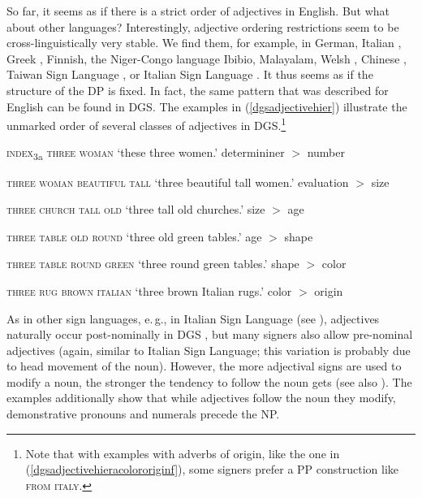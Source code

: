 So far, it seems as if there is a strict order of adjectives in English. But what about other languages? Interestingly, adjective ordering restrictions seem to be cross-linguistically very stable. We find them, for example, in German, Italian \citep{cinque2010syntax}, Greek \citep{alexiadou2001adjective}, Finnish, the Niger-Congo language Ibibio, Malayalam, Welsh \citep{scott2002stacked}, Chinese \citep{sproat1991cross}, Taiwan Sign Language \citep{zhang2007universal}, or Italian Sign Language \citep{bertone2009syntax, mantovan2017nominalmoditalian}. It thus seems as if the structure of the DP is fixed. In fact, the same pattern that was described for English can be found in DGS. The examples in (\ref{dgsadjectivehier}) illustrate the unmarked order of several classes of adjectives in DGS.\footnote{ Note that with examples with adverbs of origin, like the one in (\ref{dgsadjectivehieracolororiginf}), some signers prefer a PP construction like \textsc{from italy}.}

\begin{exe}
\ex\label{dgsadjectivehier}\begin{xlist} 
\ex \textsc{index}\textsubscript{3a} \textsc{three woman} 
\glt `these three women.' \hfill determininer $>$ number \label{dgsadjectivehiera}

\ex \textsc{three woman beautiful tall} 
\glt `three beautiful tall women.' \hfill evaluation $>$ size \label{dgsadjectivehierb}

\ex \textsc{three church tall old} 
\glt `three tall old churches.' \hfill size $>$ age \label{dgsadjectivehierc}

\ex \textsc{three table old round}%
\glt `three old green tables.' \hfill age $>$ shape \label{dgsadjectivehierd}

\ex  \textsc{three table round green}%
\glt `three round green tables.' \hfill shape $>$ color \label{dgsadjectivehiere}

\ex \textsc{three rug brown italian} 
\glt `three brown Italian rugs.' \hfill color $>$ origin \label{dgsadjectivehieracolororiginf}
\end{xlist}
\end{exe}

\noindent As in other sign languages, e.\,g., in Italian Sign Language (see \citealt[284]{cecchetto2009another}), adjectives naturally occur post-nominally in DGS \citep[18]{herrmann2013modal}, but many signers also allow pre-nominal adjectives (again, similar to Italian Sign Language; this variation is probably due to head movement of the noun). However, the more adjectival signs are used to modify a noun, the stronger the tendency to follow the noun gets (see also \citealt[146]{papaspyrou2008grammatik}). The examples additionally show that while adjectives follow the noun they modify, demonstrative pronouns and numerals precede the NP.


